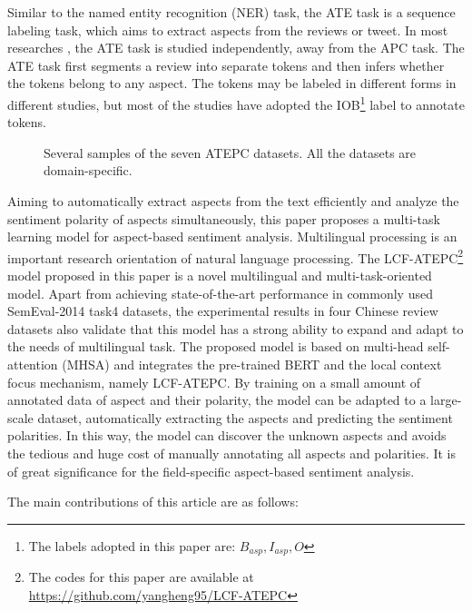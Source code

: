 \documentclass[a4paper,fleqn]{cas-sc}
\begin{document}
Similar to the named entity recognition \cite{sang2003introduction} (NER) task, the ATE task is a sequence labeling task, which aims to extract aspects from the reviews or tweet. In most researches \cite{chen2017recurrent, xue2018aspect, chen2017improving}, the ATE task is studied independently, away from the APC task. The ATE task first segments a review into separate tokens and then infers whether the tokens belong to any aspect. The tokens may be labeled in different forms in different studies, but most of the studies have adopted the IOB\footnote{The labels adopted in this paper are: $B_{asp}, I_{asp}, O$} label to annotate tokens.

\begin{figure*}[pos=h]
	\centering
	\caption{Several samples of the seven ATEPC datasets. All the datasets are domain-specific.}
	\label{fig:samples}
\end{figure*}

Aiming to automatically extract aspects from the text efficiently and analyze the sentiment polarity of aspects simultaneously, this paper proposes a multi-task learning model for aspect-based sentiment analysis. Multilingual processing is an important research orientation of natural language processing. The LCF-ATEPC\footnote{The codes for this paper are available at \url{https://github.com/yangheng95/LCF-ATEPC}} model proposed in this paper is a novel multilingual and multi-task-oriented model. Apart from achieving state-of-the-art performance in commonly used SemEval-2014 task4 datasets, the experimental results in four Chinese review datasets also validate that this model has a strong ability to expand and adapt to the needs of multilingual task. The proposed model is based on multi-head self-attention (MHSA) and integrates the pre-trained BERT \cite{devlin2019bert} and the local context focus mechanism, namely LCF-ATEPC. By training on a small amount of annotated data of aspect and their polarity, the model can be adapted to a large-scale dataset, automatically extracting the aspects and predicting the sentiment polarities. In this way, the model can discover the unknown aspects and avoids the tedious and huge cost of manually annotating all aspects and polarities. It is of great significance for the field-specific aspect-based sentiment analysis.

The main contributions of this article are as follows:
\end{document}
